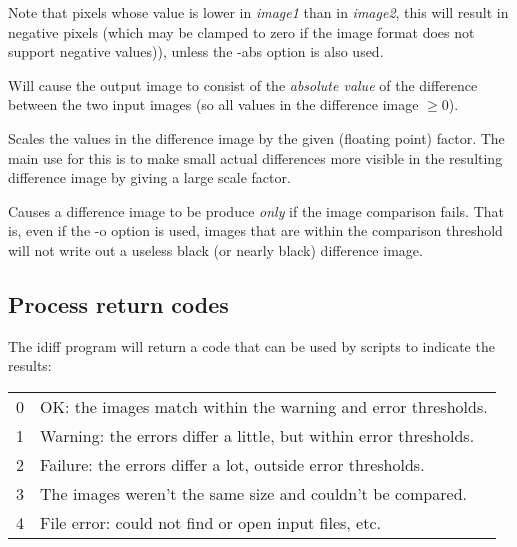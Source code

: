 Note that pixels whose value is lower in \emph{image1} than in
\emph{image2}, this will result in negative pixels (which may be clamped
to zero if the image format does not support negative values)), unless
the {\cf -abs} option is also used.  
\apiend

Will cause the output image to consist of the \emph{absolute value}
of the difference between the two input images (so all values in the
difference image $\ge 0$).
\apiend

Scales the values in the difference image by the given (floating point)
factor.  The main use for this is to make small actual differences more
visible in the resulting difference image by giving a large scale factor.
\apiend

Causes a difference image to be produce \emph{only} if the image
comparison fails.  That is, even if the {\cf -o} option is used,
images that are within the comparison threshold will not write out
a useless black (or nearly black) difference image.
\apiend

\subsection*{Process return codes}

The {\cf idiff} program will return a code that can be used by scripts
to indicate the results:

\medskip

\begin{tabular}{p{0.3in} p{5in}}
0 & OK: the images match within the warning and error
thresholds. \\
1 & Warning: the errors differ a little, but within error thresholds. \\ 
2 & Failure: the errors differ a lot, outside error thresholds. \\
3 & The images weren't the same size and couldn't be compared. \\
4 & File error: could not find or open input files, etc.
\end{tabular}

\begin{code}
\end{code}

